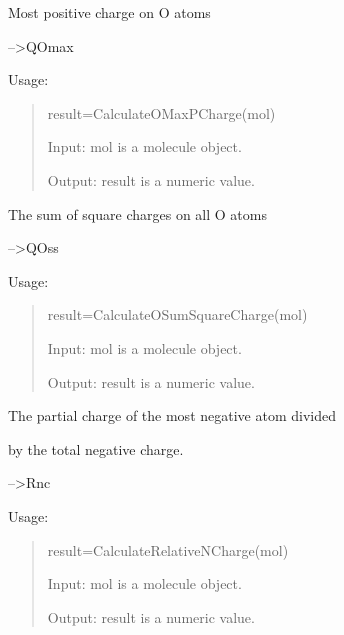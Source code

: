 \documentclass[letterpaper,10pt,english]{sphinxmanual}
\begin{document}

\begin{fulllineitems}
\label{reference/charge:charge.CalculateOMaxPCharge}
Most positive charge on O atoms

--\textgreater{}QOmax

Usage:
\begin{quote}

result=CalculateOMaxPCharge(mol)

Input: mol is a molecule object.

Output: result is a numeric value.
\end{quote}

\end{fulllineitems}


\begin{fulllineitems}
\label{reference/charge:charge.CalculateOSumSquareCharge}
The sum of square charges on all O atoms

--\textgreater{}QOss

Usage:
\begin{quote}

result=CalculateOSumSquareCharge(mol)

Input: mol is a molecule object.

Output: result is a numeric value.
\end{quote}

\end{fulllineitems}


\begin{fulllineitems}
\label{reference/charge:charge.CalculateRelativeNCharge}
The partial charge of the most negative atom divided

by the total negative charge.

--\textgreater{}Rnc

Usage:
\begin{quote}

result=CalculateRelativeNCharge(mol)

Input: mol is a molecule object.

Output: result is a numeric value.
\end{quote}

\end{fulllineitems}
\end{document}
